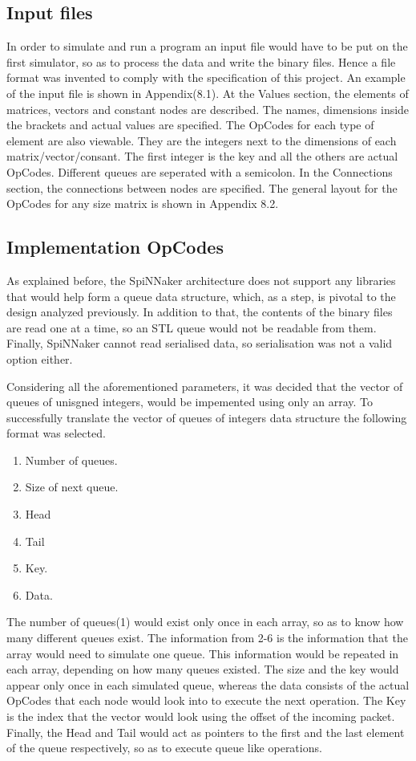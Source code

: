 \documentclass[12pt,a4paper]{article}
\begin{document}
\subsection{Input files}
In order to simulate and run a program an input file would have to be put on the first simulator, so as to process the data and write the binary files. Hence a file format was invented to comply with the specification of this project. An example of the input file is shown in Appendix(8.1). At the Values section, the elements of matrices, vectors and constant nodes are described. The names, dimensions inside the brackets and actual values are specified. The OpCodes for each type of element are also viewable. They are the integers next to the dimensions of each matrix/vector/consant. The first integer is the key and all the others are actual OpCodes. Different queues are seperated with a semicolon. In the Connections section, the connections between nodes are specified. The general layout for the OpCodes for any size matrix  is shown in Appendix 8.2.
\subsection{Implementation OpCodes}
As explained before, the SpiNNaker architecture does not support any libraries that would help form a queue data structure, which, as a step, is pivotal to the design analyzed previously. In addition to that, the contents of the binary files are read one at a time, so an STL queue would not be readable from them. Finally, SpiNNaker cannot read serialised data, so serialisation was not a valid option either.

Considering all the aforementioned parameters, it was decided that the vector of queues of unisgned integers, would be impemented using only an array. To successfully translate the vector of queues of integers data structure the following format was selected.

\begin{enumerate}
\item Number of queues.
\item Size of next queue.
\item Head
\item Tail
\item Key.
\item Data.
\end{enumerate}
The number of queues(1) would exist only once in each array, so as to know how many different queues exist. The information from 2-6 is the information that the array would need to simulate one queue. This information would be repeated in each array, depending on how many queues existed. The size and the key would appear only once in each simulated queue, whereas the data consists of the actual OpCodes that each node would look into to execute the next operation. The Key is the index that the vector would look using the offset of the incoming packet. Finally, the Head and Tail would act as pointers to the first and the last element of the queue respectively, so as to execute queue like operations.
\end{document}
